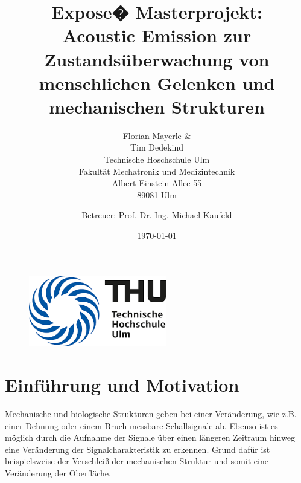 \documentclass[twoside, 12pt, a4paper]{article}
\title{ \textbf{ Expose� Masterprojekt:}\\ \vspace{2cm} Acoustic Emission zur Zustands\"uberwachung von menschlichen Gelenken und mechanischen Strukturen}
\author{Florian Mayerle \& \\
	Tim Dedekind \\
	Technische Hoschschule Ulm \\
	Fakult\"at Mechatronik und Medizintechnik\\
	Albert-Einstein-Allee 55\\
	89081 Ulm  \\
	\and 
	Betreuer: Prof. Dr.-Ing. Michael Kaufeld  \\
	
}
\date{\today}
\begin{document}
	
	\setlength\parindent{0pt}
	
	\begin{figure}
		\centering
		
		\includegraphics[width=6cm,keepaspectratio]{Images/THU}
	\end{figure}
	
	\maketitle
	
	\newpage
	\fancyhf{}
	\fancyhead[RO,LE]{\rightmark}
	\fancyfoot[RO,LE]{\thepage}
	
	\newpage
	\setcounter{page}{1}
	\tableofcontents
	\listoffigures
	\newpage
	
	\section{Einf\"uhrung und Motivation}
	
	
	Mechanische und biologische Strukturen geben bei einer Ver\"anderung, wie z.B. einer Dehnung oder einem Bruch messbare Schallsignale ab. Ebenso ist es m\"oglich durch die Aufnahme der Signale \"uber einen l\"angeren Zeitraum hinweg eine Ver\"anderung der Signalcharakteristik zu erkennen. Grund daf\"ur ist beispielsweise der Verschlei{\ss} der mechanischen Struktur und somit eine Ver\"anderung der Oberfl\"ache.\\     
	
\end{document}
